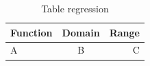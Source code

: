 \documentclass{article}
\begin{document}
\begin{table}[h]
\centering
\begin{tabular}{|l|c|r|}
\hline
\textbf{Function} & \textbf{Domain} & \textbf{Range} \\
\hline
A & B & C \\
\hline
\end{tabular}
\caption{Table regression}
\end{table}
\end{document}
